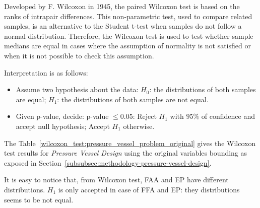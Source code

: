 Developed by F. Wilcoxon in 1945, the paired Wilcoxon test is based on the ranks
of intrapair differences. This non-parametric test, used to compare related samples,
is an alternative to the Student t-test when samples do not follow a normal distribution.
Therefore, the Wilcoxon test is used to test whether sample medians are equal in cases
where the assumption of normality is not satisfied or when it is not possible to check
this assumption.

Interpretation is as follows:
\begin{itemize}
    \item Assume two hypothesis about the data:
        \subitem $H_0$: the distributions of both samples are equal;
        \subitem $H_1$: the distributions of both samples are not equal.
    \item Given p-value, decide:
        \subitem p-value $\leq 0.05$: Reject $H_1$ with $95\%$ of confidence and accept null hypothesis;
        \subitem Accept $H_1$ otherwise.
\end{itemize}

The Table~\ref{wilcoxon_test:pressure_vessel_problem_original} gives the Wilcoxon test results
for \textit{Pressure Vessel Design} using the original variables bounding as exposed in Section~\ref{subsubsec:methodology-pressure-vessel-design}.

\begin{table}[H]
\centering
\caption{Significance Test Using Wilcoxon Test for Pressure Vessel Design (Original)}
\label{wilcoxon_test:pressure_vessel_problem_original}
\end{table}

It is easy to notice that, from Wilcoxon test, FAA and EP have different distributions.
$H_1$ is only accepted in case of FFA and EP: they distributions seems to be not equal.